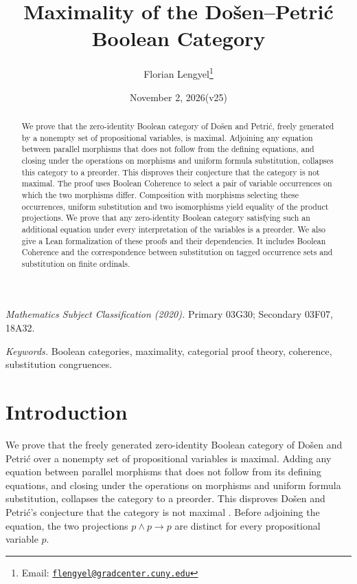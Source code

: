 \documentclass[11pt]{article}
\title{Maximality of the Do\v{s}en--Petri\'c Boolean Category}
\author{Florian Lengyel\thanks{Email: \href{mailto:flengyel@gradcenter.cuny.edu}{\texttt{flengyel@gradcenter.cuny.edu}}}}
\date{November 2, 2026\quad(v25)}
\begin{document}
\maketitle

\begin{abstract}
We prove that the zero-identity Boolean category of Do\v{s}en and
Petri\'c, freely generated by a nonempty set of propositional
variables, is maximal. Adjoining any equation between parallel morphisms that does not follow
from the defining equations, and closing under the operations on morphisms
and uniform formula substitution, collapses this category to a preorder.
This disproves their conjecture that the category is not maximal.
The proof uses Boolean Coherence to select a pair of variable
occurrences on which the two morphisms differ. Composition with morphisms
selecting these occurrences, uniform substitution and two
isomorphisms yield equality of the product projections. We
prove that any zero-identity Boolean category satisfying such an
additional equation under every interpretation of the variables is
a preorder. We also give a Lean formalization of these proofs and
their dependencies. It includes Boolean Coherence and the
correspondence between substitution on tagged occurrence sets and
substitution on finite ordinals.
\end{abstract}

\medskip
\noindent\textit{Mathematics Subject Classification (2020).}
Primary 03G30; Secondary 03F07, 18A32.

\smallskip
\noindent\textit{Keywords.} Boolean categories, maximality, categorial proof theory,
coherence, substitution congruences.

\section{Introduction}

We prove that the freely generated zero-identity Boolean category of
Do\v{s}en and Petri\'c over a nonempty set of propositional variables
is maximal. Adding any equation between parallel morphisms that does
not follow from its defining equations, and closing under the operations on
morphisms and uniform formula substitution, collapses the category
to a preorder. This disproves Do\v{s}en and Petri\'c's conjecture that the category
is not maximal \cite[\S14.2, p.~322]{DP}. Before adjoining the equation, the
two projections $p\wedge p\to p$ are distinct for every
propositional variable $p$.
\end{document}
